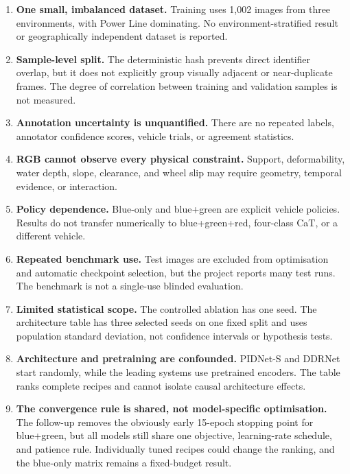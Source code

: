 \begin{enumerate}
  \item \textbf{One small, imbalanced dataset.} Training uses 1,002 images from
  three environments, with Power Line dominating. No environment-stratified
  result or geographically independent dataset is reported.

  \item \textbf{Sample-level split.} The deterministic hash prevents direct
  identifier overlap, but it does not explicitly group visually adjacent or
  near-duplicate frames. The degree of correlation between training and
  validation samples is not measured.

  \item \textbf{Annotation uncertainty is unquantified.} There are no repeated
  labels, annotator confidence scores, vehicle trials, or agreement statistics.

  \item \textbf{RGB cannot observe every physical constraint.} Support,
  deformability, water depth, slope, clearance, and wheel slip may require
  geometry, temporal evidence, or interaction.

  \item \textbf{Policy dependence.} Blue-only and blue+green are explicit
  vehicle policies. Results do not transfer numerically to blue+green+red,
  four-class CaT, or a different vehicle.

  \item \textbf{Repeated benchmark use.} Test images are excluded from
  optimisation and automatic checkpoint selection, but the project reports
  many test runs. The benchmark is not a single-use blinded evaluation.

  \item \textbf{Limited statistical scope.} The controlled ablation has one
  seed. The architecture table has three selected seeds on one fixed split and uses
  population standard deviation, not confidence intervals or hypothesis tests.

  \item \textbf{Architecture and pretraining are confounded.} PIDNet-S and
  DDRNet start randomly, while the leading systems use pretrained encoders.
  The table ranks complete recipes and cannot isolate causal architecture
  effects.

  \item \textbf{The convergence rule is shared, not model-specific
  optimisation.} The follow-up removes the obviously early 15-epoch stopping
  point for blue+green, but all models still share one objective, learning-rate
  schedule, and patience rule. Individually tuned recipes could change the
  ranking, and the blue-only matrix remains a fixed-budget result.


\end{enumerate}
